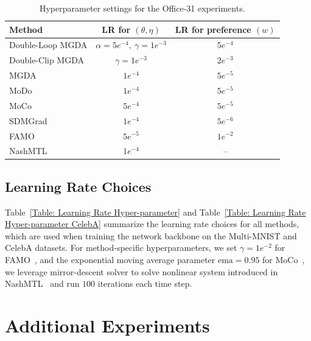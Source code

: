 \documentclass[twoside]{article} %
\theoremstyle{plain}
\theoremstyle{definition}
\theoremstyle{remark}
\begin{document}
\begin{table}[t]
\centering
\caption{Hyperparameter settings for the Office-31 experiments.}
\label{tab:office31_hyperparameters}
{
\scriptsize
\renewcommand{\arraystretch}{1.08}
\setlength{\tabcolsep}{1.5pt}
\begin{tabular*}{\textwidth}{
    @{\extracolsep{\fill}}
    lcc
    @{}
}
\toprule
Method & LR for $(\theta,\eta)$ & LR for preference $(w)$ \\
\midrule
Double-Loop MGDA
& $\alpha=5e^{-4},\ \gamma=1e^{-3}$
& $5e^{-4}$ \\

Double-Clip MGDA
& $\gamma=1e^{-3}$
& $2e^{-3}$ \\

MGDA~\citep{MGDA1stwork}
& $1e^{-4}$
& $5e^{-5}$ \\

MoDo~\citep{MODO}
& $1e^{-4}$
& $5e^{-5}$ \\

MoCo~\citep{MOCO}
& $5e^{-4}$
& $5e^{-5}$ \\

SDMGrad~\citep{SDMkaiyiJi}
& $1e^{-4}$
& $5e^{-6}$ \\

FAMO~\citep{FAMO}
& $5e^{-5}$
& $1e^{-2}$ \\

NashMTL~\citep{nashMTL}
& $1e^{-4}$
& -- \\
\bottomrule
\end{tabular*}}
\end{table}

\subsection{Learning Rate Choices}
Table~\ref{Table: Learning Rate Hyper-parameter} and Table~\ref{Table: Learning Rate Hyper-parameter CelebA} summarize the learning rate choices for all methods, which are used when training the network backbone on the Multi-MNIST and CelebA datasets. For method-specific hyperparameters, we set $\gamma = 1e^{-2}$ for FAMO~\citep{FAMO}, and the exponential moving average parameter $\text{ema}=0.95$ for MoCo~\citep{MOCO}, we leverage mirror-descent solver to solve nonlinear system introduced in NashMTL~\citep{nashMTL} and run $100$ iterations each time step.


\section{Additional Experiments}\label{Appendix: Synthetic Experiments}
\end{document}
